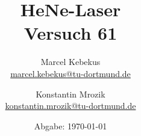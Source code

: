 

\title{HeNe-Laser\\
\small{Versuch 61}}
\author{%
  Marcel Kebekus\\%
  \href{mailto:marcel.kebekus@tu-dortmund.de}{marcel.kebekus@tu-dortmund.de} \and
  Konstantin Mrozik\\
  \href{mailto:konstantin.mrozik@tu-dortmund.de}{konstantin.mrozik@tu-dortmund.de}%
}
\date{
  Abgabe: \today %
}
\publishers{TU Dortmund – Fakultät Physik}
\makeatletter         
\def\@maketitle{
\raggedright
\texttt{[image: bilder/lo\_TU-Do\_2008/logo\_rgb\_jpg/tud\_logo\_rgb.jpg]}\\[8ex]
\begin{center}
{\Huge \bfseries \sffamily \@title }\\[4ex] 
{\Large  \@author}\\[4ex] 
\@date\\[8ex]
\publishers\\
\end{center}}
\makeatother





\maketitle
\thispagestyle{empty}
\tableofcontents
\newpage





\newpage
\nocite{*}
\printbibliography




